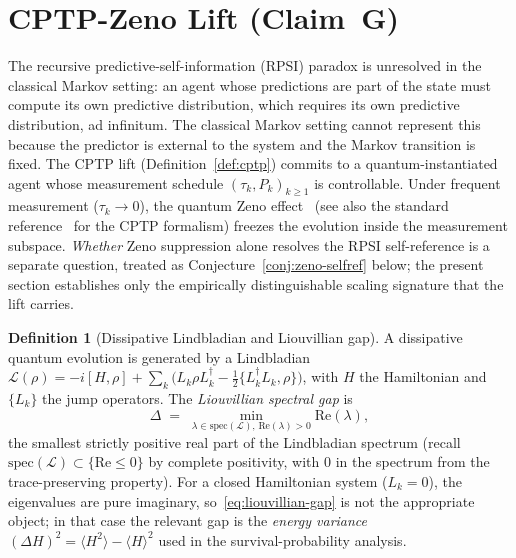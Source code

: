 \documentclass[11pt,a4paper]{article}
\theoremstyle{plain}
\theoremstyle{definition}
\newtheorem{definition}[theorem]{Definition}
\theoremstyle{remark}
\begin{document}
\section{CPTP-Zeno Lift (Claim~G)}\label{sec:cptp}

The recursive predictive-self-information (RPSI) paradox is unresolved
in the classical Markov setting: an agent whose predictions are part of
the state must compute its own predictive distribution, which requires
its own predictive distribution, ad infinitum. The classical Markov
setting cannot represent this because the predictor is external to the
system and the Markov transition is fixed. The CPTP lift
(Definition~\ref{def:cptp}) commits to a quantum-instantiated agent
whose measurement schedule $(\tau_k, P_k)_{k\geq 1}$ is controllable.
Under frequent measurement ($\tau_k \to 0$), the quantum Zeno
effect~\cite{misra1977,facchi2008} (see also the standard
reference~\cite{nielsen2000} for the CPTP formalism) freezes the
evolution inside the measurement subspace. \emph{Whether} Zeno
suppression alone resolves the RPSI self-reference is a separate
question, treated as Conjecture~\ref{conj:zeno-selfref} below; the
present section establishes only the empirically distinguishable
scaling signature that the lift carries.

\begin{definition}[Dissipative Lindbladian and Liouvillian gap]
\label{def:lindbladian}
A dissipative quantum evolution is generated by a Lindbladian
$\mathcal L(\rho) = -i[H, \rho] + \sum_k \bigl(L_k \rho L_k^\dagger
- \tfrac{1}{2}\{L_k^\dagger L_k, \rho\}\bigr)$, with $H$ the
Hamiltonian and $\{L_k\}$ the jump operators. The \emph{Liouvillian
spectral gap} is
\begin{equation}\label{eq:liouvillian-gap}
  \Delta \;=\; \min_{\lambda \in \mathrm{spec}(\mathcal L),
  \,\mathrm{Re}(\lambda) > 0} \mathrm{Re}(\lambda),
\end{equation}
the smallest strictly positive real part of the Lindbladian spectrum
(recall $\mathrm{spec}(\mathcal L) \subset \{\mathrm{Re}\leq 0\}$ by
complete positivity, with $0$ in the spectrum from the trace-preserving
property). For a closed Hamiltonian system ($L_k = 0$), the
eigenvalues are pure imaginary, so~\eqref{eq:liouvillian-gap} is not
the appropriate object; in that case the relevant gap is the
\emph{energy variance} $(\Delta H)^2 = \langle H^2 \rangle -
\langle H \rangle^2$ used in the survival-probability analysis.
\end{definition}
\end{document}

